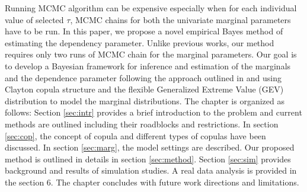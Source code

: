 \documentclass[11pt]{article}
\theoremstyle{remboldstyle}
\begin{document}
Running MCMC algorithm can be expensive especially when for each individual value of selected $\tau$, MCMC chains for both the univariate marginal parameters have to be run. In this paper, we propose a novel empirical Bayes method of estimating the dependency parameter. Unlike previous works, our method requires only two runs of MCMC chain for the marginal parameters. Our goal is to develop a Bayesian framework for inference and estimation of the marginals and the dependence parameter following the approach outlined in \cite{doss:2010} and \cite{roy:2014} using Clayton copula structure and the flexible Generalized Extreme Value (GEV) distribution to model the marginal distributions. The chapter is organized as follows: Section \ref{sec:intr} provides a brief introduction to the problem and current methods are outlined including their roadblocks and restrictions. In section \ref{sec:cop}, the concept of copula and different types of copulas have been discussed. In section \ref{sec:marg}, the model settings are described. Our proposed method is outlined in details in section \ref{sec:method}. Section \ref{sec:sim} provides background and results of simulation studies. A real data analysis is provided in the section 6. The chapter concludes with future work directions and limitations.
\end{document}
